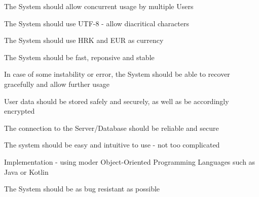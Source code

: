 			 \begin{packed_item}
			 	\item The System should allow concurrent usage by multiple Users
			 	\item The System should use UTF-8 - allow diacritical characters
			 	\item The System should use HRK and EUR as currency
			 	\item The System should be fast, reponsive and stable
			 	\item In case of some instability or error, the System should be able to recover gracefully and allow further usage
			 	\item User data should be stored safely and securely, as well as be accordingly encrypted
			 	\item The connection to the Server/Database should be reliable and secure
			 	\item The system should be easy and intuitive to use - not too complicated
			 	\item Implementation - using moder Object-Oriented Programming Languages such as Java or Kotlin
			 	\item The System should be as bug resistant as possible
			 \end{packed_item}
